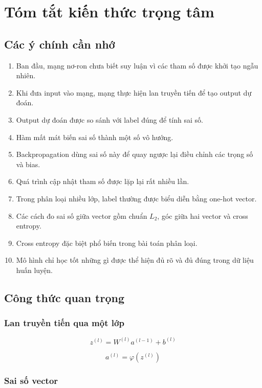 \documentclass[12pt,a4paper]{report}
\begin{document}
\chapter{Tóm tắt kiến thức trọng tâm}

\section{Các ý chính cần nhớ}

\begin{enumerate}
    \item Ban đầu, mạng nơ-ron chưa biết suy luận vì các tham số được khởi tạo ngẫu nhiên.
    \item Khi đưa input vào mạng, mạng thực hiện lan truyền tiến để tạo output dự đoán.
    \item Output dự đoán được so sánh với label đúng để tính sai số.
    \item Hàm mất mát biến sai số thành một số vô hướng.
    \item Backpropagation dùng sai số này để quay ngược lại điều chỉnh các trọng số và bias.
    \item Quá trình cập nhật tham số được lặp lại rất nhiều lần.
    \item Trong phân loại nhiều lớp, label thường được biểu diễn bằng one-hot vector.
    \item Các cách đo sai số giữa vector gồm chuẩn $L_2$, góc giữa hai vector và cross entropy.
    \item Cross entropy đặc biệt phổ biến trong bài toán phân loại.
    \item Mô hình chỉ học tốt những gì được thể hiện đủ rõ và đủ đúng trong dữ liệu huấn luyện.
\end{enumerate}

\section{Công thức quan trọng}

\subsection*{Lan truyền tiến qua một lớp}

\[
    z^{(l)} = W^{(l)}a^{(l-1)} + b^{(l)}
\]

\[
    a^{(l)} = \varphi(z^{(l)})
\]

\subsection*{Sai số vector}
\end{document}

